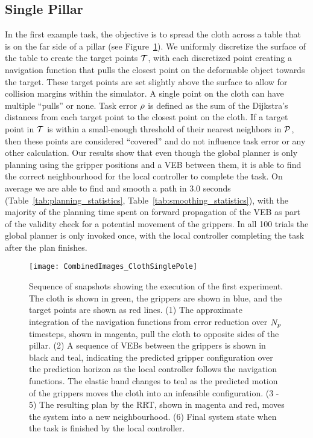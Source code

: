 \subsection{Single Pillar}
\label{sec:single_pillar}

In the first example task, the objective is to spread the cloth across a table that is on the far side  of a pillar (see Figure~\ref{fig:cloth_single_pole}). We uniformly discretize the surface of the table to create the target points $\mathcal{T}$, with each discretized point creating a navigation function that pulls the closest point on the deformable object towards the target. These target points are set slightly above the surface to allow for collision margins within the simulator. A single point on the cloth can have multiple ``pulls'' or none. Task error $\rho$ is defined as the sum of the Dijkstra's distances from each target point to the closest point on the cloth. If a target point in $\mathcal{T}$ is within a small-enough threshold of their nearest neighbors in $\mathcal{P}$, then these points are considered ``covered'' and do not influence task error or any other calculation. Our results show that even though the global planner is only planning using the gripper positions and a VEB between them, it is able to find the correct neighbourhood for the local controller to complete the task. On average we are able to find and smooth a path in 3.0 seconds (Table~\ref{tab:planning_statistics}, Table~\ref{tab:smoothing_statistics}), with the majority of the planning time spent on forward propagation of the VEB as part of the validity check for a potential movement of the grippers. In all 100 trials the global planner is only invoked once, with the local controller completing the task after the plan finishes.

\begin{figure}[h]
    \centering
    \texttt{[image: CombinedImages\_ClothSinglePole]}
    \vspace{-0.2in}
    \caption{Sequence of snapshots showing the execution of the first experiment. The cloth is shown in green, the grippers are shown in blue, and the target points are shown as red lines. (1) The approximate integration of the navigation functions from error reduction over $N_p$ timesteps, shown in magenta, pull the cloth to opposite sides of the pillar. (2) A sequence of VEBs between the grippers is shown in black and teal, indicating the predicted gripper configuration over the prediction horizon as the local controller follows the navigation functions. The elastic band changes to teal as the predicted motion of the grippers moves the cloth into an infeasible configuration. (3 - 5) The resulting plan by the RRT, shown in magenta and red, moves the system into a new neighbourhood. (6) Final system state when the task is finished by the local controller.}
    \label{fig:cloth_single_pole}
\end{figure}

